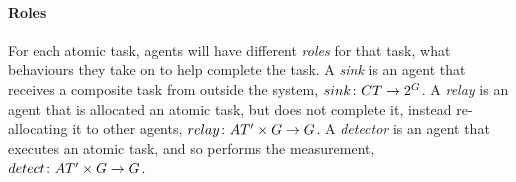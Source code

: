 \paragraph{Roles}
\label{section:roles}

\newcommand{\formalSinkRole}[2]{
	\functionFormal{sink}
	{\setCompositeTask{}{}}
	{\powerSetAgents}{}{}
}
\newcommand{\functionSinkRole}[2]{
	\functionSignature{sink}
	{\setAtomicTaskInstance{#1}{}}
}
\newcommand{\functionSinkRoleAtomic}[2]{
	\functionSignature{sink}
	{\lbrace\varAtomicTask{#1}{}\rbrace}
}

\newcommand{\formalDetectorRole}[2]{
	\functionFormal{detect}{\setAtomicTaskInstance{}{} \times \setAgent{}{}}{ \setAgent{}{}}
}
\newcommand{\functionDetectorRole}[2]{
	\functionSignature{detect}{\varAtomicTask{#1}{#2}}
}

\newcommand{\formalRelayRole}[2]{
	\functionFormal{relay}{\setAtomicTaskInstance{}{} \times \setAgent{}{}}{ \setAgent{}{}}
}
\newcommand{\functionRelayRole}[3]{
	\functionSignature{relay_{#1}}{\varAtomicTask{#2}{}, \varAgent{#3}{}}
}

For each atomic task, agents will have different \textit{roles} for that task,  what behaviours they take on to help complete the task. A \textit{sink} is an agent that  receives a composite task from outside the system, $\formalSinkRole{}{}$. A \textit{relay} is an agent that is allocated an atomic task, but does not complete it, instead re-allocating it to other agents, $\formalRelayRole{}{}$. A \textit{detector} is an agent that  executes an atomic task, and so performs the measurement, $\formalDetectorRole{}{}$. 